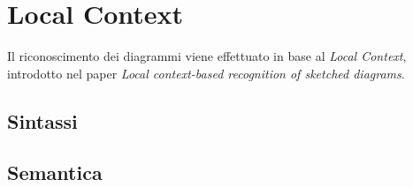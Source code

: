 \chapter{Local Context}\label{ch:localcontext}
    Il riconoscimento dei diagrammi viene effettuato in base al \textit{Local Context}, introdotto nel paper \textit{Local context-based recognition of sketched diagrams}\cite{localcontext_recognition}.
    \section{Sintassi}
    \section{Semantica}